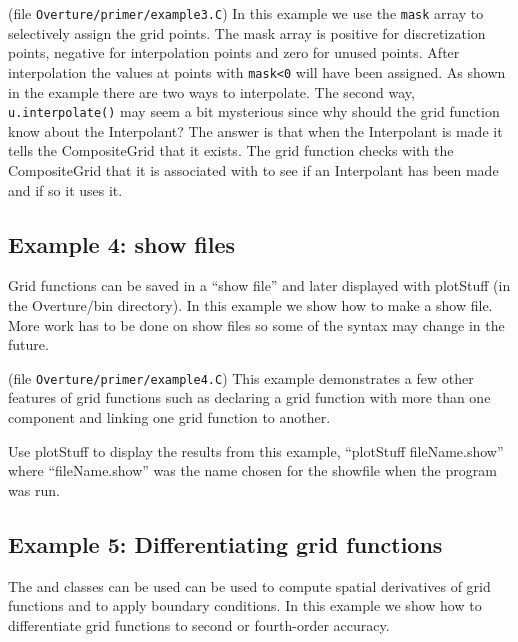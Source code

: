 \documentclass{article}
\begin{document}
(file {\tt Overture/primer/example3.C})
{\footnotesize
{}
}
In this example we use the {\tt mask} array to selectively assign 
the grid points. The mask array is positive for discretization points,
negative for interpolation points and zero for unused points.
After interpolation the values at points with {\tt mask<0} will 
have been assigned.
As shown in the example there are two ways to interpolate.
The second way, {\tt u.interpolate()} may seem a bit mysterious since
why should the grid function know about the Interpolant? The answer
is that when the Interpolant is made it tells the CompositeGrid
that it exists. The grid function checks with the CompositeGrid that
it is associated with to see if an Interpolant has been made and
if so it uses it.

\vfill\eject
\subsection{Example 4: show files}

Grid functions can be saved in a ``show file'' and later displayed
with plotStuff (in the Overture/bin directory). In this example we show how to make a show file.
More work has to be done on show files so some of the syntax
may change in the future.

(file {\tt Overture/primer/example4.C})
{\footnotesize
{}
}
This example demonstrates a few other features of grid functions such
as declaring a grid function with more than one component and linking
one grid function to another.

Use plotStuff to display the results from this example, ``plotStuff fileName.show''
where ``fileName.show'' was the name chosen for the showfile when the program was run.

\vfill\eject
\subsection{Example 5: Differentiating grid functions}

The {\tt \MGO} and {\tt \CGO} classes can be used
can be used to compute spatial
derivatives of grid functions and to apply boundary conditions.
In this example we show how to differentiate grid functions
to second or fourth-order accuracy.
\end{document}

